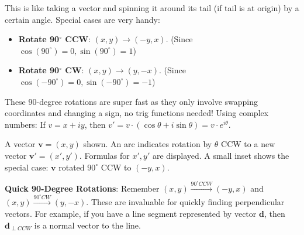 \begin{intuition}
\label{intuition:A.1.1.rotation}
This is like taking a vector and spinning it around its tail (if tail is at origin) by a certain angle.
Special cases are very handy:
\begin{itemize}
    \item \textbf{Rotate 90$^\circ$ CCW}: $(x,y) \to (-y,x)$. (Since $\cos(90^\circ)=0, \sin(90^\circ)=1$)
    \item \textbf{Rotate 90$^\circ$ CW}: $(x,y) \to (y,-x)$. (Since $\cos(-90^\circ)=0, \sin(-90^\circ)=-1$)
\end{itemize}
These 90-degree rotations are super fast as they only involve swapping coordinates and changing a sign, no trig functions needed!
Using complex numbers: If $v = x+iy$, then $v' = v \cdot (\cos\theta + i\sin\theta) = v \cdot e^{i\theta}$.
\end{intuition}

\begin{visualexample}
\label{vis:A.1.1.rotation}
A vector $\mathbf{v}=(x,y)$ shown. An arc indicates rotation by $\theta$ CCW to a new vector $\mathbf{v}'=(x',y')$. Formulas for $x', y'$ are displayed. A small inset shows the special case: $\mathbf{v}$ rotated $90^\circ$ CCW to $(-y,x)$.
\end{visualexample}

\begin{tipsbox}
\label{tips:A.1.1.rotation_90_deg}
\textbf{Quick 90-Degree Rotations}: Remember $(x,y) \xrightarrow{90^\circ CCW} (-y,x)$ and $(x,y) \xrightarrow{90^\circ CW} (y,-x)$. These are invaluable for quickly finding perpendicular vectors. For example, if you have a line segment represented by vector $\mathbf{d}$, then $\mathbf{d}_{\perp CCW}$ is a normal vector to the line.
\end{tipsbox}
